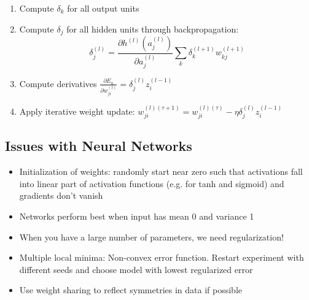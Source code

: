 \begin{itemize}
	\begin{enumerate}
		\item Compute $\delta_k$ for all output units
		\item Compute $\delta_j$ for all hidden units through backpropagation:
		$$\delta_j^{(l)} = \dfrac{\partial h^{(l)}\left(a_j^{(l)}\right)}{\partial a_j^{(l)}}\sum\limits_{k}\delta_k^{(l+1)}w_{kj}^{(l+1)}$$
		\item Compute derivatives $\frac{\partial E_n}{\partial w_{ji}^{(l)}}=\delta_j^{(l)}z_{i}^{(l-1)}$
		\item Apply iterative weight update: 
		$w_{ji}^{(l)(\tau+1)} = w_{ji}^{(l)(\tau)}-\eta \delta_j^{(l)}z_{i}^{(l-1)}$
	\end{enumerate}
\end{itemize}
\subsection{Issues with Neural Networks}
\begin{itemize}
	\item Initialization of weights: randomly start near zero such that activations fall into linear part of activation functions (e.g. for tanh and sigmoid) and gradients don't vanish
	\item Networks perform best when input has mean 0 and variance 1
	\item When you have a large number of parameters, we need regularization!
	\item Multiple local minima: Non-convex error function. Restart experiment with different seeds and choose model with lowest regularized error
	\item Use weight sharing to reflect symmetries in data if possible
\end{itemize}